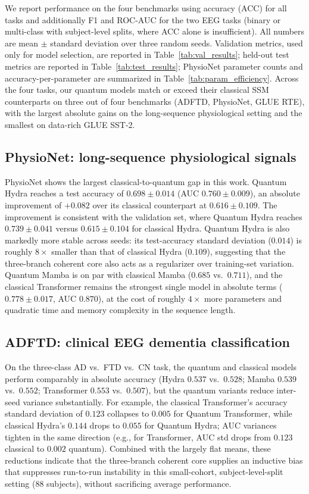 \documentclass[conference]{IEEEtran}
\begin{document}
We report performance on the four benchmarks using accuracy (ACC) for all tasks and additionally F1 and ROC-AUC for the two EEG tasks (binary or multi-class with subject-level splits, where ACC alone is insufficient). All numbers are mean $\pm$ standard deviation over three random seeds. Validation metrics, used only for model selection, are reported in Table~\ref{tab:val_results}; held-out test metrics are reported in Table~\ref{tab:test_results}; PhysioNet parameter counts and accuracy-per-parameter are summarized in Table~\ref{tab:param_efficiency}. Across the four tasks, our quantum models match or exceed their classical SSM counterparts on three out of four benchmarks (ADFTD, PhysioNet, GLUE RTE), with the largest absolute gains on the long-sequence physiological setting and the smallest on data-rich GLUE SST-2.

\subsection{PhysioNet: long-sequence physiological signals}
\label{sec:results_physionet}

PhysioNet shows the largest classical-to-quantum gap in this work. Quantum Hydra reaches a test accuracy of $0.698 \pm 0.014$ (AUC $0.760 \pm 0.009$), an absolute improvement of $+0.082$ over its classical counterpart at $0.616 \pm 0.109$. The improvement is consistent with the validation set, where Quantum Hydra reaches $0.739 \pm 0.041$ versus $0.615 \pm 0.104$ for classical Hydra. Quantum Hydra is also markedly more stable across seeds: its test-accuracy standard deviation ($0.014$) is roughly $8\times$ smaller than that of classical Hydra ($0.109$), suggesting that the three-branch coherent core also acts as a regularizer over training-set variation. Quantum Mamba is on par with classical Mamba ($0.685$ vs.\ $0.711$), and the classical Transformer remains the strongest single model in absolute terms ($0.778 \pm 0.017$, AUC $0.870$), at the cost of roughly $4{\times}$ more parameters and quadratic time and memory complexity in the sequence length.

\subsection{ADFTD: clinical EEG dementia classification}
\label{sec:results_adftd}

On the three-class AD vs.\ FTD vs.\ CN task, the quantum and classical models perform comparably in absolute accuracy (Hydra $0.537$ vs.\ $0.528$; Mamba $0.539$ vs.\ $0.552$; Transformer $0.553$ vs.\ $0.507$), but the quantum variants reduce inter-seed variance substantially. For example, the classical Transformer's accuracy standard deviation of $0.123$ collapses to $0.005$ for Quantum Transformer, while classical Hydra's $0.144$ drops to $0.055$ for Quantum Hydra; AUC variances tighten in the same direction (e.g., for Transformer, AUC std drops from $0.123$ classical to $0.002$ quantum). Combined with the largely flat means, these reductions indicate that the three-branch coherent core supplies an inductive bias that suppresses run-to-run instability in this small-cohort, subject-level-split setting (88 subjects), without sacrificing average performance.
\end{document}
